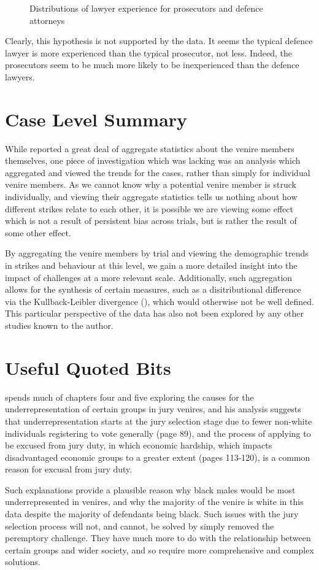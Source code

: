 \begin{figure}[h!]
  \caption[Lawyer Experience (Sunshine)]
  {Distributions of lawyer experience for prosecutors and defence attorneys}
  \label{fig:lawyerexp}
\end{figure}

Clearly, this hypothesis is not supported by the data. It seems the typical defence lawyer is more experienced than the typical
prosecutor, not less. Indeed, the prosecutors seem to be much more likely to be inexperienced than the defence lawyers.
  
\section{Case Level Summary} \label{sec:casesum}

While \cite{JurySunshineProj} reported a great deal of aggregate statistics about the venire members themselves, one piece of
investigation which was lacking was an analysis which aggregated and viewed the trends for the cases, rather than simply for
individual venire members. As we cannot know why a potential venire member is struck individually, and viewing their aggregate
statistics tells us nothing about how different strikes relate to each other, it is possible we are viewing some effect which is
not a result of persistent bias across trials, but is rather the result of some other effect.

By aggregating the venire members by trial and viewing the demographic trends in strikes and behaviour at this level, we gain a
more detailed insight into the impact of challenges at a more relevant scale. Additionally, such aggregation allows for the
synthesis of certain measures, such as a disitributional difference via the Kullback-Leibler divergence (\cite{kullback1951}),
which would otherwise not be well defined. This particular perspective of the data has also not been explored by any other studies
known to the author.

\section{Useful Quoted Bits}

\cite{vandykejurysel} spends much of chapters four and five exploring the causes for the underrepresentation of certain groups in
jury venires, and his analysis suggests that underrepresentation starts at the jury selection stage due to fewer non-white
individuals registering to vote generally (page 89), and the process of applying to be excused from jury duty, in which economic
hardship, which impacts disadvantaged economic groups to a greater extent (pages 113-120), is a common reason for excusal from
jury duty.

Such explanations provide a plausible reason why black males would be most underrepresented in venires, and why the majority of
the venire is white in this data despite the majority of defendants being black. Such issues with the jury selection process will
not, and cannot, be solved by simply removed the peremptory challenge. They have much more to do with the relationship between
certain groups and wider society, and so require more comprehensive and complex solutions.